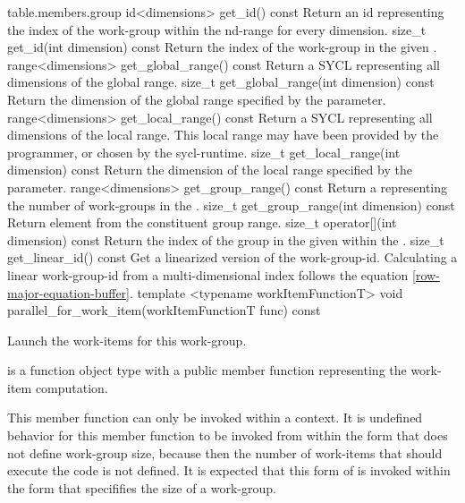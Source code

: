 {table.members.group}
  \addRow
    {id<dimensions> get_id() const}
    {
        Return an \gls{id} representing the index of the work-group
        within the \gls{nd-range} for every dimension.
    }
  \addRow
    {size_t get_id(int dimension) const}
    {
        Return the index of the work-group in the given .
    }
  \addRow
    {range<dimensions> get_global_range() const}
    {
        Return a SYCL  representing all dimensions of the global range.
    }
  \addRow
    {size_t get_global_range(int dimension) const}
    {
        Return the dimension of the global range specified by the  parameter.
    }
  \addRow
    {range<dimensions> get_local_range() const}
    {
        Return a SYCL  representing all dimensions of the local range.
        This local range may have been provided by the programmer, or chosen by the \gls{sycl-runtime}.
    }
  \addRow
    {size_t get_local_range(int dimension) const}
    {
        Return the dimension of the local range specified by the  parameter.
    }
  \addRow
    {range<dimensions> get_group_range() const}
    {
        Return a  representing the number of \glspl{work-group} in the .
    }
  \addRow
    {size_t get_group_range(int dimension) const}
    {
        Return element  from the constituent group range.
    }
  \addRow
    {size_t operator[](int dimension) const}
    {
        Return the index of the group in the given 
        within the .
    }
  \addRow
    {size_t get_linear_id() const}
    {
        Get a linearized version of the \gls{work-group-id}.
        Calculating a linear \gls{work-group-id}
        from a multi-dimensional index follows the equation \ref{row-major-equation-buffer}.
    }
  \addRowTwoL
    {template <typename workItemFunctionT>}
    {void parallel_for_work_item(workItemFunctionT func) const}
    {
      Launch the work-items for this work-group.

       is a function object type with a public member function
      representing the work-item computation.

      This member function can only be invoked within a
       context.  It is
      undefined behavior for this member function to be invoked
      from within the  form that
      does not define work-group size, because then the number of
      work-items that should execute the code is not defined.  It is
      expected that this form of 
      is invoked within the  form
      that specififies the size of a work-group.
    }
